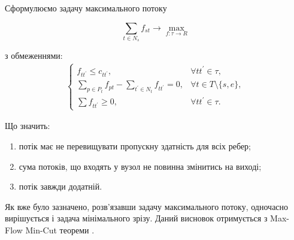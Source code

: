 Сформулюємо задачу максимального потоку

\begin{equation*}
    \sum_{t \in N_s} f_{st} \rightarrow \max_{f: \tau \rightarrow R }
\end{equation*}

з обмеженнями:
\begin{equation*}
    \begin{gathered}
        \begin{cases}
            f_{tt^{'}} \leq  c_{tt^{'}},                                   & \forall tt^{'}  \in \tau ,         \\
            \sum_{p \in P_t} f_{pt} - \sum_{t^{'} \in N_t} f_{tt^{'}} = 0, & \forall t \in T \setminus \{s,e\}, \\
            \sum f_{tt^{'}} \geq 0,                                        & \forall tt^{'}  \in \tau.
        \end{cases}
    \end{gathered}
\end{equation*}

Що значить:
\begin{enumerate}
    \item потік має не перевищувати пропускну здатність для всіх ребер;
    \item сума потоків, що входять у вузол не повинна змінитись на виході;
    \item потік завжди додатній.
\end{enumerate}

Як вже було зазначено, розв'язавши задачу максимального потоку, одночасно вирішується і задача
мінімального зрізу. Даний висновок отримується з Max-Flow Min-Cut теореми \cite{ford_fulkerson}.

